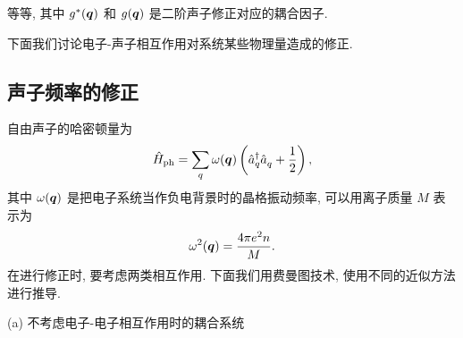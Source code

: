 等等, 其中 $g^*(\boldsymbol{q})$ 和 $g(\boldsymbol{q})$ 是二阶声子修正对应的耦合因子.

下面我们讨论电子-声子相互作用对系统某些物理量造成的修正. 

\subsection{声子频率的修正}

自由声子的哈密顿量为 
\begin{equation}
    \hat{H}_{\mathrm{ph}}=\sum_q\omega(\boldsymbol{q})\left( \hat{a}_q^\dagger \hat{a}_q^{ }+\frac{1}{2} \right),
\end{equation}
其中 $\omega(\boldsymbol{q})$ 是把电子系统当作负电背景时的晶格振动频率, 可以用离子质量 $M$ 表示为
\begin{equation}
    \omega^2(\boldsymbol{q})=\frac{4\pi e^2n}{M}.
\end{equation}
在进行修正时, 要考虑两类相互作用. 下面我们用费曼图技术, 使用不同的近似方法进行推导.

(a) 不考虑电子-电子相互作用时的耦合系统 

